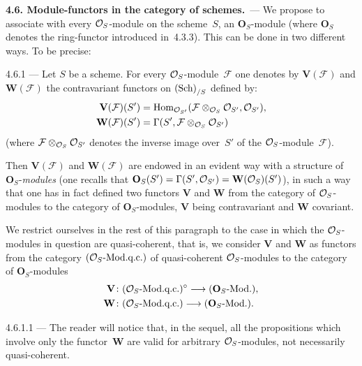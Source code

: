 \par{}
\noindent\textbf{4.6. Module-functors in the category of schemes.}\label{I.sec.4.6}\ ---
We propose to associate with every \(\mathcal{O}_S\)-module on the scheme~\(S\), an \(\mathbf{O}_S\)-module (where \(\mathbf{O}_S\) denotes the ring-functor introduced in~4.3.3). This can be done in two different ways. To be precise:

\begin{definition}{4.6.1}\label{I.4.6.1}
--- Let \(S\) be a scheme. For every \(\mathcal{O}_S\)-module~\(\mathcal{F}\) one denotes by \(\mathbf{V}(\mathcal{F})\) and \(\mathbf{W}(\mathcal{F})\) the contravariant functors on \(\textup{(Sch)}_{/S}\) defined by:
\begin{align*}
\mathbf{V}(\mathcal{F})(S') &= \operatorname{Hom}_{\mathcal{O}_{S'}}(\mathcal{F} \otimes_{\mathcal{O}_S} \mathcal{O}_{S'}, \mathcal{O}_{S'}), \\
\mathbf{W}(\mathcal{F})(S') &= \Gamma(S', \mathcal{F} \otimes_{\mathcal{O}_S} \mathcal{O}_{S'})
\end{align*}
(where \(\mathcal{F} \otimes_{\mathcal{O}_S} \mathcal{O}_{S'}\) denotes the inverse image over~\(S'\) of the \(\mathcal{O}_S\)-module~\(\mathcal{F}\)).

Then \(\mathbf{V}(\mathcal{F})\) and \(\mathbf{W}(\mathcal{F})\) are endowed in an evident way with a structure of \(\mathbf{O}_S\)-\emph{modules} (one recalls that \(\mathbf{O}_S(S') = \Gamma(S', \mathcal{O}_{S'}) = \mathbf{W}(\mathcal{O}_S)(S')\)), in such a way that one has in fact defined two functors \(\mathbf{V}\) and \(\mathbf{W}\) from the category of \(\mathcal{O}_S\)-modules to the category of \(\mathbf{O}_S\)-modules, \(\mathbf{V}\) being contravariant and \(\mathbf{W}\) covariant.
\end{definition}

We restrict ourselves in the rest of this paragraph to the case in which the \(\mathcal{O}_S\)-modules in question are quasi-coherent, that is, we consider \(\mathbf{V}\) and \(\mathbf{W}\) as functors from the category \((\mathcal{O}_S\text{-Mod.q.c.})\) of quasi-coherent \(\mathcal{O}_S\)-modules to the category of \(\mathbf{O}_S\)-modules
\begin{align*}
\mathbf{V} &\colon (\mathcal{O}_S\text{-Mod.q.c.})^{\circ} \longrightarrow (\mathbf{O}_S\text{-Mod.}), \\
\mathbf{W} &\colon (\mathcal{O}_S\text{-Mod.q.c.}) \longrightarrow (\mathbf{O}_S\text{-Mod.}).
\end{align*}

\begin{remark}{4.6.1.1}\label{I.4.6.1.1}
--- {\renewcommand{\thefootnote}{(31)}}
The reader will notice that, in the sequel, all the propositions which involve only the functor~\(\mathbf{W}\) are valid for arbitrary \(\mathcal{O}_S\)-modules, not necessarily quasi-coherent.
\end{remark}

